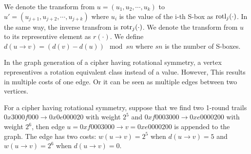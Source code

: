 We denote the transform from $u=(u_1,u_2,\cdots,u_k)$ to $u'=(u_{j+1},u_{j+2},\cdots,u_{j+k})$ where $u_i$ is the value of the i-th S-box as $\text{rotl}_j(\cdot)$. In the same way, the inverse transfrom is $\text{rotr}_j(\cdot)$. We denote the transform from $u$ to its representive element as $r(\cdot)$. We define $d(u\rightarrow v)=(d(v)-d(u))\mod sn$ where $sn$ is the number of S-boxes. 

In the graph generation of a cipher having rotational symmetry, a vertex representives a rotation equivalent class instead of a value. However, This results in multiple costs of one edge. Or it can be seen as multiple edges between two vertices. 

\begin{example}
	For a cipher having rotational symmetry, suppose that we find two 1-round trails $0x3000f000\rightarrow 0x0e000020$ with weight $2^5$ and $0xf0003000\rightarrow 0xe0000200$ with weight $2^6$, then edge $u=0xf0003000\rightarrow v=0xe0000200$ is appended to the graph. The edge has two costs: $w(u\rightarrow v)=2^5$ when $d(u\rightarrow v)=5$ and $w(u\rightarrow v)=2^6$ when $d(u\rightarrow v)=0$. 
\end{example}
